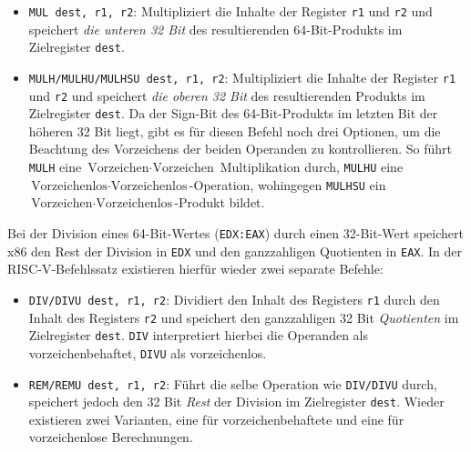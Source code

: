 \begin{itemize}
  \item \lstinline[style=risc-v_Assembler]!MUL dest, r1, r2!: Multipliziert die Inhalte der Register
    \lstinline[style=risc-v_Assembler]!r1! und \lstinline[style=risc-v_Assembler]!r2! und speichert \emph{die unteren 32 Bit} des
    resultierenden 64-Bit-Produkts im Zielregister \lstinline[style=risc-v_Assembler]!dest!.
  \item \lstinline[style=risc-v_Assembler]!MULH/MULHU/MULHSU dest, r1, r2!: Multipliziert die Inhalte der Register
    \lstinline[style=risc-v_Assembler]!r1! und \lstinline[style=risc-v_Assembler]!r2! und speichert \emph{die oberen 32 Bit} des
    resultierenden Produkts im Zielregister \lstinline[style=risc-v_Assembler]!dest!. Da der Sign-Bit des
    64-Bit-Produkts im letzten Bit der höheren 32 Bit liegt, gibt es für diesen
    Befehl noch drei Optionen, um die Beachtung des Vorzeichens der
    beiden Operanden zu kontrollieren. So führt \lstinline[style=risc-v_Assembler]!MULH! eine
    $\text{Vorzeichen} \cdot \text{Vorzeichen}$ Multiplikation durch, \lstinline[style=risc-v_Assembler]!MULHU!
    eine $\text{Vorzeichenlos} \cdot \text{Vorzeichenlos}$-Operation, wohingegen
    \lstinline[style=risc-v_Assembler]!MULHSU! ein $\text{Vorzeichen} \cdot \text{Vorzeichenlos}$-Produkt bildet.
\end{itemize}

Bei der Division eines 64-Bit-Wertes (\lstinline[style=x86Assembler]!EDX:EAX!) durch einen 32-Bit-Wert speichert x86 den Rest der Division in
\lstinline[style=x86Assembler]!EDX! und den ganzzahligen Quotienten in \lstinline[style=x86Assembler]!EAX!. In der
RISC-V-Befehlssatz existieren hierfür wieder zwei separate Befehle:

\begin{itemize}
\item \lstinline[style=risc-v_Assembler]!DIV/DIVU dest, r1, r2!: Dividiert den Inhalt des Registers \lstinline[style=risc-v_Assembler]!r1!
  durch den Inhalt des Registers \lstinline[style=risc-v_Assembler]!r2! und speichert den ganzzahligen 32 Bit
  \emph{Quotienten} im Zielregister \lstinline[style=risc-v_Assembler]!dest!. \lstinline[style=risc-v_Assembler]!DIV! interpretiert hierbei die Operanden als vorzeichenbehaftet, \lstinline[style=risc-v_Assembler]!DIVU! als vorzeichenlos.
  \item \lstinline[style=risc-v_Assembler]!REM/REMU dest, r1, r2!: Führt die selbe Operation wie \lstinline[style=risc-v_Assembler]!DIV/DIVU!
    durch, speichert jedoch den 32 Bit \emph{Rest} der Division im Zielregister
    \lstinline[style=risc-v_Assembler]!dest!. Wieder existieren zwei Varianten, eine für vorzeichenbehaftete und eine für vorzeichenlose Berechnungen.
\end{itemize}

